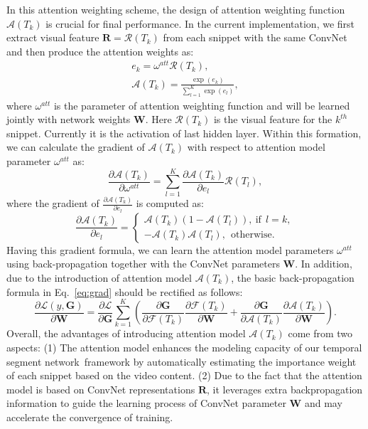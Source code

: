 \documentclass[10pt,journal,compsoc]{IEEEtran}
\newcommand{\SEGNET}{temporal segment network}
\begin{document}
In this attention weighting scheme, the design of attention weighting function $\mathcal{A}(T_k)$ is crucial for final performance. In the current implementation, we first extract visual feature $\mathbf{R} = \mathcal{R}(T_k)$ from each snippet with the same ConvNet and then produce the attention weights as:
\begin{equation}
\begin{split}
e_k = \omega^{att} \mathcal{R}(T_k), \\
\mathcal{A}(T_k) = \frac{\exp(e_k)}{\sum_{l=1}^K \exp(e_l)},
\end{split}
\end{equation}
where $\omega^{att}$ is the parameter of attention weighting function and will be learned jointly with network weights $\mathbf{W}$. Here $\mathcal{R}(T_k)$ is the visual feature for the $k^{th}$ snippet. Currently it is the activation of last hidden layer. Within this formation, we can calculate the gradient of $\mathcal{A}(T_k)$ with respect to attention model parameter $\omega^{att}$ as:
\begin{equation}
\frac{\partial \mathcal{A}(T_k)} {\partial \omega^{att}} =  \sum_{l=1}^K \frac{\partial \mathcal{A}(T_k)}{\partial e_l} \mathcal{R}(T_l),
\end{equation}
where the gradient of $\frac{\partial \mathcal{A}(T_k)}{\partial e_l}$ is computed as:
\begin{equation}
 \frac{\partial \mathcal{A}(T_k)} {\partial e_l}= \left \{ 
 \begin{array}{l}
 \mathcal{A}(T_k)(1-\mathcal{A}(T_l)), \ \textrm{if} \ \ l=k, \\
 -\mathcal{A}(T_k)\mathcal{A}(T_l),\ \ \textrm{otherwise.}
 \end{array} 
 \right.
\end{equation}
Having this gradient formula, we can learn the attention model parameters $\omega^{att}$ using back-propagation together with the ConvNet parameters $\mathbf{W}$. In addition, due to the introduction of attention model $\mathcal{A}(T_k)$, the basic back-propagation formula in Eq.~\ref{eq:grad} should be rectified as follows:
\begin{equation}\label{eq:attgrad}
\frac{\partial \mathcal{L}(y, \mathbf{G})}{\partial \mathbf{W}} = 
\frac{\partial\mathcal{L}}{\partial \mathbf{G}} \sum_{k=1}^K \left ( \frac{\partial \mathbf{G}}{\partial \mathcal{F}(T_k)} \frac{\partial \mathcal{F}(T_k)}{\partial \mathbf{W}} + \frac{\partial \mathbf{G}}{\partial \mathcal{A}(T_k)} \frac{\partial \mathcal{A}(T_k)}{\partial \mathbf{W}} \right ).
\end{equation}
Overall, the advantages of introducing attention model $\mathcal{A}(T_k)$ come from two aspects: (1) The attention model enhances the modeling capacity of our \SEGNET~framework by automatically estimating the importance weight of each snippet based on the video content. (2) Due to the fact that the attention model is based on ConvNet representations $\mathbf{R}$, it leverages extra backpropagation information to guide the learning process of ConvNet parameter $\mathbf{W}$ and may accelerate the convergence of training.
\end{document}
